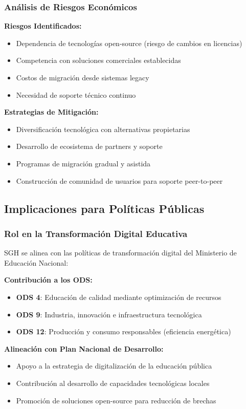 \subsubsection{Análisis de Riesgos Económicos}

\textbf{Riesgos Identificados:}
\begin{itemize}
\item Dependencia de tecnologías open-source (riesgo de cambios en licencias)
\item Competencia con soluciones comerciales establecidas
\item Costos de migración desde sistemas legacy
\item Necesidad de soporte técnico continuo
\end{itemize}

\textbf{Estrategias de Mitigación:}
\begin{itemize}
\item Diversificación tecnológica con alternativas propietarias
\item Desarrollo de ecosistema de partners y soporte
\item Programas de migración gradual y asistida
\item Construcción de comunidad de usuarios para soporte peer-to-peer
\end{itemize}

\subsection{Implicaciones para Políticas Públicas}

\subsubsection{Rol en la Transformación Digital Educativa}

SGH se alinea con las políticas de transformación digital del Ministerio de Educación Nacional:

\textbf{Contribución a los ODS:}
\begin{itemize}
\item \textbf{ODS 4}: Educación de calidad mediante optimización de recursos
\item \textbf{ODS 9}: Industria, innovación e infraestructura tecnológica
\item \textbf{ODS 12}: Producción y consumo responsables (eficiencia energética)
\end{itemize}

\textbf{Alineación con Plan Nacional de Desarrollo:}
\begin{itemize}
\item Apoyo a la estrategia de digitalización de la educación pública
\item Contribución al desarrollo de capacidades tecnológicas locales
\item Promoción de soluciones open-source para reducción de brechas
\end{itemize}

